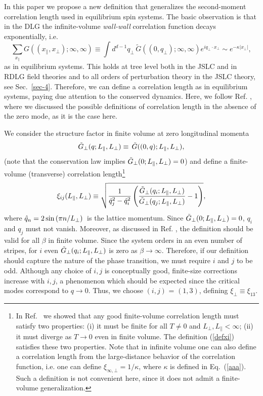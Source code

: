 \documentclass[12pt]{article}
\begin{document}
In this paper we propose a new definition that generalizes the 
second-moment correlation length used in equilibrium spin
systems. The basic observation is that in the DLG the infinite-volume 
{\em wall-wall} correlation function decays exponentially, i.e. 
\begin{equation}
\sum_{x_\|} G((x_\|,x_\bot);\infty,\infty) \equiv 
   \int d^{d-1}q_\bot\, \tilde{G}((0,q_\bot);\infty,\infty) 
   e^{iq_\bot\cdot x_\bot} \sim e^{-\kappa |x_\bot|},
\label{aaa}
\end{equation}
as in equilibrium systems. This holds at tree level 
both in the JSLC and in RDLG field theories and to all orders of 
perturbation theory in the JSLC theory, see Sec.~\ref{sec-4}.
Therefore, we can define a correlation length as in equilibrium systems,
paying due attention to the conserved dynamics.
Here, we follow
Ref. \cite{correlation_length}, where we discussed the possible 
definitions of correlation length in the absence of the zero mode, 
as it is the case here. 

We consider the structure factor in finite volume
at zero longitudinal momenta
\begin{equation}
        \tilde{G}_{\bot}(q; L_{\|}, L_{\bot}) \equiv\, 
           {\tilde{G}}((0,q); 
        L_{\|}, L_{\bot}) ,
\label{struct-bot}
\end{equation}
(note that the conservation law 
implies $\tilde{G}_{\bot}(0; L_{\|}, L_{\bot})=0$)
and define a finite-volume (transverse) correlation length\footnote{
In Ref.~\cite{correlation_length} we showed that any good 
finite-volume correlation length must satisfy two properties:
(i) it must be finite for all $T\not=0$ and $L_\bot,L_\| < \infty$;
(ii) it must diverge as $T\to 0$ even in finite volume. 
The definition (\ref{defxi}) satisfies these two properties. 
Note that in infinite volume one can also define a correlation length
from the large-distance behavior of the correlation function, i.e.
one can define $\xi_{\infty,\bot} = 1/\kappa$, where $\kappa$ is defined 
in Eq.~(\ref{aaa}). Such a definition is not convenient here, since it does not 
admit a finite-volume generalization.
}
\begin{equation}
\label{defxi}
        {\xi}_{ij}(L_{\|}, L_{\bot}) \equiv
        \sqrt{\frac{1}{\hat{q}_{j}^{2} - \hat{q}_{i}^{2}}
        \left( 
\frac{\tilde{G}_{\bot}(q_{i}; L_{\|}, L_{\bot})}{
        \tilde{G}_{\bot}(q_{j}; L_{\|},
        L_{\bot})} -1\right) },
\end{equation}
where $\hat{q}_{n}=2\sin{(\pi n/L_{\bot})}$\ is the lattice momentum.
Since $\tilde{G}_{\bot}(0; L_{\|}, L_{\bot})=0$,
$q_i$ and $q_j$ must not vanish. Moreover, 
as discussed in Ref. \cite{correlation_length}, the definition
should be valid for all $\beta$ in finite volume. Since the system orders in an 
even number of stripes, for $i$ even $\tilde{G}_{\bot}(q_i; L_{\|}, L_{\bot})$ 
is zero as $\beta\to \infty$. Therefore, if our definition should capture 
the nature of the phase transition, we must require $i$ and $j$ to be odd.
Although any choice of $i,j$ is conceptually good, 
finite-size corrections increase with $i,j$, a phenomenon which should 
be expected since the critical modes correspond to 
$q\to 0$. Thus, we choose $(i,j)$ = $(1,3)$, defining 
$\xi_\bot \equiv \xi_{13}$.
\end{document}
